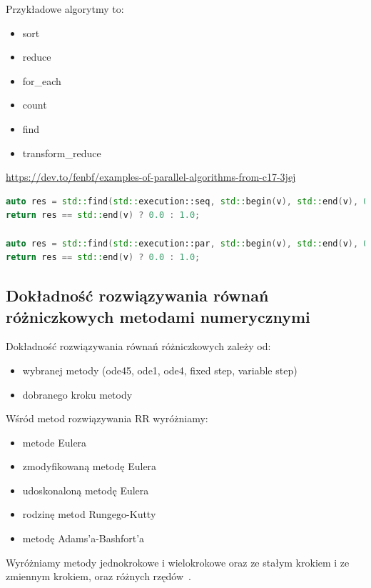 \documentclass[wi]{zut}
\begin{document}
Przykładowe algorytmy to:

\begin{itemize}
    \item sort
    \item reduce
    \item for\_each
    \item count
    \item find
    \item transform\_reduce~\cite{MicrosoftCPP17}
\end{itemize}


{\url{https://dev.to/fenbf/examples-of-parallel-algorithms-from-c17-3jej}}{\label{kod:przyklad}}
\begin{lstlisting}[language=C++]
auto res = std::find(std::execution::seq, std::begin(v), std::end(v), 0.6);
return res == std::end(v) ? 0.0 : 1.0;

auto res = std::find(std::execution::par, std::begin(v), std::end(v), 0.6);
return res == std::end(v) ? 0.0 : 1.0;
\end{lstlisting}


\subsection{Dokładność rozwiązywania równań różniczkowych metodami numerycznymi}

Dokładność rozwiązywania równań różniczkowych zależy od:

\begin{itemize}
    \item wybranej metody (ode45, ode1, ode4, fixed step, variable step)
    \item dobranego kroku metody
\end{itemize}
\question

Wśród metod rozwiązywania RR wyróżniamy:
\begin{itemize}
    \item metode Eulera
    \item zmodyfikowaną metodę Eulera
    \item udoskonaloną metodę Eulera
    \item rodzinę metod Rungego-Kutty
    \item metodę Adams'a-Bashfort'a
\end{itemize}

Wyróżniamy metody jednokrokowe i wielokrokowe oraz ze stałym krokiem i ze zmiennym krokiem, oraz różnych rzędów~\cite{Piela_RR}.
\end{document}
